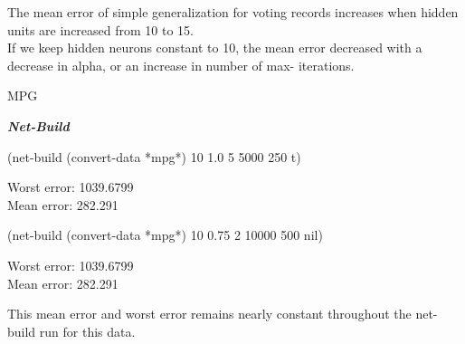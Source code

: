 \documentclass{article}
\begin{document}
 \begin{normalsize}
 The mean error of simple generalization for voting records increases when hidden units are increased from 10 to 15. \\
 If we keep hidden neurons constant to 10, the mean error decreased with a decrease in alpha, or an increase in number of max- iterations.\\
 \end{normalsize}
 
 
\begin{flushleft}
 \begin{Large}
 MPG\\
 \end{Large}
\end{flushleft}
 
\textbf{\emph{Net-Build}\\}

  \begin{small}
(net-build (convert-data *mpg*) 10 1.0 5 5000 250 t)
  \end{small}
  
  \begin{normalsize}
  
  \begin{flushleft}
  Worst error: 1039.6799\\
  Mean error: 282.291
  \end{flushleft}
  
  
  \begin{small}
(net-build (convert-data *mpg*) 10 0.75 2 10000 500 nil)
  \end{small}
  
  \begin{flushleft}
  Worst error: 1039.6799\\
  Mean error: 282.291
  \end{flushleft}
  
  
  This mean error and worst error remains nearly constant throughout the net-build run for this data.\\\\
  \end{normalsize}
 
\end{document}
